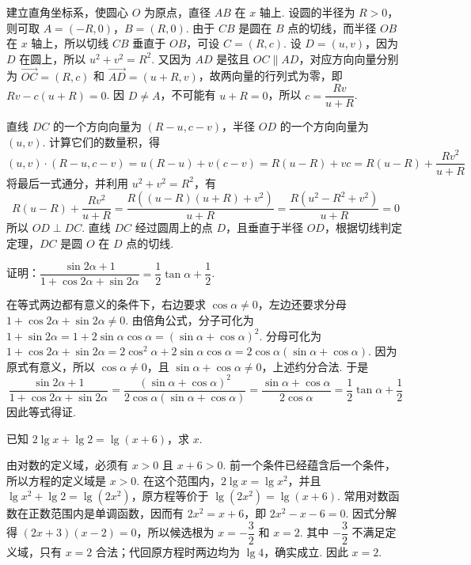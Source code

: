 \begin{solution}
建立直角坐标系，使圆心 \(O\) 为原点，直径 \(AB\) 在 \(x\) 轴上. 设圆的半径为 \(R>0\)，则可取 \(A=(-R,0)\)，\(B=(R,0)\). 由于 \(CB\) 是圆在 \(B\) 点的切线，而半径 \(OB\) 在 \(x\) 轴上，所以切线 \(CB\) 垂直于 \(OB\)，可设 \(C=(R,c)\). 设 \(D=(u,v)\)，因为 \(D\) 在圆上，所以 \(u^2+v^2=R^2\). 又因为 \(AD\) 是弦且 \(OC\parallel AD\)，对应方向向量分别为 \(\overrightarrow{OC}=(R,c)\) 和 \(\overrightarrow{AD}=(u+R,v)\)，故两向量的行列式为零，即 \(Rv-c(u+R)=0\). 因 \(D\ne A\)，不可能有 \(u+R=0\)，所以 \(c=\dfrac{Rv}{u+R}\).

直线 \(DC\) 的一个方向向量为 \((R-u,c-v)\)，半径 \(OD\) 的一个方向向量为 \((u,v)\). 计算它们的数量积，得
\[
(u,v)\cdot(R-u,c-v)=u(R-u)+v(c-v)=R(u-R)+vc=R(u-R)+\frac{Rv^2}{u+R}
\]
将最后一式通分，并利用 \(u^2+v^2=R^2\)，有
\[
R(u-R)+\frac{Rv^2}{u+R}=\frac{R\left((u-R)(u+R)+v^2\right)}{u+R}=\frac{R(u^2-R^2+v^2)}{u+R}=0
\]
所以 \(OD\perp DC\). 直线 \(DC\) 经过圆周上的点 \(D\)，且垂直于半径 \(OD\)，根据切线判定定理，\(DC\) 是圆 \(O\) 在 \(D\) 点的切线.
\end{solution}

\begin{problem}
证明：\(\dfrac{\sin2\alpha+1}{1+\cos2\alpha+\sin2\alpha}=\dfrac{1}{2}\tan\alpha+\dfrac{1}{2}\).
\end{problem}

\begin{solution}
在等式两边都有意义的条件下，右边要求 \(\cos\alpha\ne0\)，左边还要求分母 \(1+\cos2\alpha+\sin2\alpha\ne0\). 由倍角公式，分子可化为 \(1+\sin2\alpha=1+2\sin\alpha\cos\alpha=\left(\sin\alpha+\cos\alpha\right)^2\). 分母可化为 \(1+\cos2\alpha+\sin2\alpha=2\cos^2\alpha+2\sin\alpha\cos\alpha=2\cos\alpha\left(\sin\alpha+\cos\alpha\right)\). 因为原式有意义，所以 \(\cos\alpha\ne0\)，且 \(\sin\alpha+\cos\alpha\ne0\)，上述约分合法. 于是
\[
\frac{\sin2\alpha+1}{1+\cos2\alpha+\sin2\alpha}=\frac{\left(\sin\alpha+\cos\alpha\right)^2}{2\cos\alpha\left(\sin\alpha+\cos\alpha\right)}=\frac{\sin\alpha+\cos\alpha}{2\cos\alpha}=\frac{1}{2}\tan\alpha+\frac{1}{2}
\]
因此等式得证.
\end{solution}

\begin{problem}
已知 \(2\lg x+\lg2=\lg\left(x+6\right)\)，求 \(x\).
\end{problem}

\begin{solution}
由对数的定义域，必须有 \(x>0\) 且 \(x+6>0\). 前一个条件已经蕴含后一个条件，所以方程的定义域是 \(x>0\). 在这个范围内，\(2\lg x=\lg x^2\)，并且 \(\lg x^2+\lg2=\lg\left(2x^2\right)\)，原方程等价于 \(\lg\left(2x^2\right)=\lg\left(x+6\right)\). 常用对数函数在正数范围内是单调函数，因而有 \(2x^2=x+6\)，即 \(2x^2-x-6=0\). 因式分解得 \(\left(2x+3\right)\left(x-2\right)=0\)，所以候选根为 \(x=-\dfrac{3}{2}\) 和 \(x=2\). 其中 \(-\dfrac{3}{2}\) 不满足定义域，只有 \(x=2\) 合法；代回原方程时两边均为 \(\lg4\)，确实成立. 因此 \(x=2\).
\end{solution}

